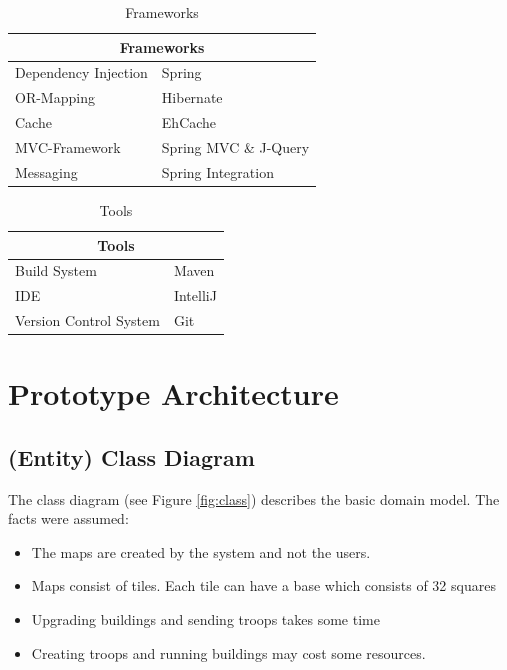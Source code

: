 \documentclass[11pt]{article}
\begin{document}
\begin{table}[h]
	\begin{tabularx}{\textwidth}{| X | X |}
	\hline
	\multicolumn{2}{|c|}{\textbf{Frameworks}} \\
	\hline
	\cellcolor[gray]{0.9}
	Dependency Injection & Spring\\
	\hline
	\cellcolor[gray]{0.9}
	OR-Mapping & Hibernate\\
	\hline
	\cellcolor[gray]{0.9}
	Cache & EhCache\\
	\hline
	\cellcolor[gray]{0.9}
	MVC-Framework & Spring MVC \& J-Query\\
	\hline
	\cellcolor[gray]{0.9}
	Messaging & Spring Integration\\
	\hline
	\end{tabularx}
	\caption{Frameworks}
	\label{frameworks}
\end{table}


\begin{table}[h]
	\begin{tabularx}{\textwidth}{| X | X |}
	\hline
	\multicolumn{2}{|c|}{\textbf{Tools}} \\
	\hline
	\cellcolor[gray]{0.9}
	Build System & Maven\\
	\hline
	\cellcolor[gray]{0.9}
	IDE & IntelliJ\\
	\hline
	\cellcolor[gray]{0.9}
	Version Control System & Git\\
	\hline
	\end{tabularx}
	\caption{Tools}
	\label{tools}
\end{table}

\section{Prototype Architecture}

\subsection{(Entity) Class Diagram}

The class diagram (see Figure \ref{fig:class}) describes the basic domain model. The facts were assumed:

\begin{itemize}
\item The maps are created by the system and not the users.
\item Maps consist of tiles. Each tile can have a base which consists of 32 squares
\item Upgrading buildings and sending troops takes some time
\item Creating troops and running buildings may cost some resources.
\end{itemize}
\end{document}
